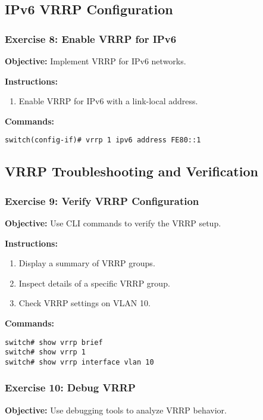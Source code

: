 \documentclass[12pt]{article}
\begin{document}
\subsection{IPv6 VRRP Configuration}

\subsubsection*{Exercise 8: Enable VRRP for IPv6}
\textbf{Objective:} Implement VRRP for IPv6 networks.

\textbf{Instructions:}
\begin{enumerate}
\item Enable VRRP for IPv6 with a link-local address.
\end{enumerate}

\textbf{Commands:}
\begin{lstlisting}[style=CiscoCLI]
switch(config-if)# vrrp 1 ipv6 address FE80::1
\end{lstlisting}

\bigskip

\subsection{VRRP Troubleshooting and Verification}

\subsubsection*{Exercise 9: Verify VRRP Configuration}
\textbf{Objective:} Use CLI commands to verify the VRRP setup.

\textbf{Instructions:}
\begin{enumerate}
\item Display a summary of VRRP groups.
\item Inspect details of a specific VRRP group.
\item Check VRRP settings on VLAN 10.
\end{enumerate}

\textbf{Commands:}
\begin{lstlisting}[style=CiscoCLI]
switch# show vrrp brief
switch# show vrrp 1
switch# show vrrp interface vlan 10
\end{lstlisting}

\bigskip

\subsubsection*{Exercise 10: Debug VRRP}
\textbf{Objective:} Use debugging tools to analyze VRRP behavior.
\end{document}
